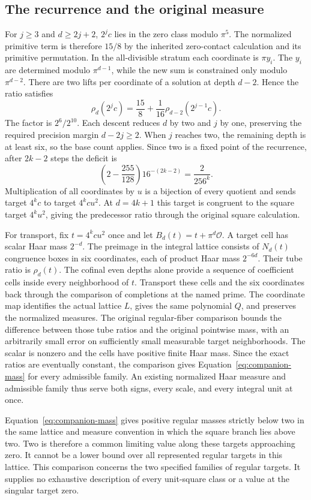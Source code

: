 \documentclass[12pt,letterpaper]{article}
\begin{document}
\subsection{The recurrence and the original measure}
For $j\geq 3$ and $d\geq 2j+2$, $2^jc$ lies in the zero class modulo $\pi^5$. The normalized primitive term is therefore $15/8$ by the inherited zero-contact calculation and its primitive permutation. In the all-divisible stratum each coordinate is $\pi y_i$. The $y_i$ are determined modulo $\pi^{d-1}$, while the new sum is constrained only modulo $\pi^{d-2}$. There are two lifts per coordinate of a solution at depth $d-2$. Hence the ratio satisfies
\[
  \rho_d(2^jc)=\frac{15}{8}+\frac1{16}\rho_{d-2}(2^{j-1}c).
\]
The factor is $2^6/2^{10}$. Each descent reduces $d$ by two and $j$ by one, preserving the required precision margin $d-2j\geq 2$. When $j$ reaches two, the remaining depth is at least six, so the base count applies. Since two is a fixed point of the recurrence, after $2k-2$ steps the deficit is
\[
   \left(2-\frac{255}{128}\right)16^{-(2k-2)}
      =\frac{2}{256^k}.
\]
Multiplication of all coordinates by $u$ is a bijection of every quotient and sends target $4^kc$ to target $4^kcu^2$. At $d=4k+1$ this target is congruent to the square target $4^ku^2$, giving the predecessor ratio through the original square calculation.

For transport, fix $t=4^kcu^2$ once and let $B_d(t)=t+\pi^d\mathcal O$. A target cell has scalar Haar mass $2^{-d}$. The preimage in the integral lattice consists of $N_d(t)$ congruence boxes in six coordinates, each of product Haar mass $2^{-6d}$. Their tube ratio is $\rho_d(t)$. The cofinal even depths alone provide a sequence of coefficient cells inside every neighborhood of $t$. Transport these cells and the six coordinates back through the comparison of completions at the named prime. The coordinate map identifies the actual lattice $L$, gives the same polynomial $Q$, and preserves the normalized measures. The original regular-fiber comparison bounds the difference between those tube ratios and the original pointwise mass, with an arbitrarily small error on sufficiently small measurable target neighborhoods. The scalar is nonzero and the cells have positive finite Haar mass. Since the exact ratios are eventually constant, the comparison gives Equation~\eqref{eq:companion-mass} for every admissible family. An existing normalized Haar measure and admissible family thus serve both signs, every scale, and every integral unit at once.

Equation~\eqref{eq:companion-mass} gives positive regular masses strictly below two in the same lattice and measure convention in which the square branch lies above two. Two is therefore a common limiting value along these targets approaching zero. It cannot be a lower bound over all represented regular targets in this lattice. This comparison concerns the two specified families of regular targets. It supplies no exhaustive description of every unit-square class or a value at the singular target zero.
\end{document}
